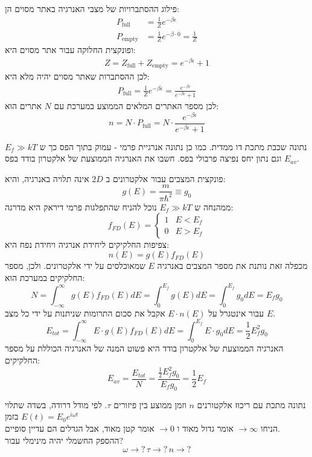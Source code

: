 \documentclass{article}
\begin{document}
\begin{Answer}
פילוג ההסתברויות של מצבי האנרגיה באתר מסוים הן:
\begin{align*}
    P_{\text{full}}&=\frac{1}{Z}e^{-\beta \epsilon}\\
    P_{\text{empty}}&=\frac{1}{Z}e^{-\beta\cdot 0}=\frac{1}{Z}
\end{align*}
ופונקצית החלוקה עבור אתר מסוים היא:
\begin{align*}
    Z=Z_{\text{full}}+Z_{\text{empty}}=e^{-\beta \epsilon}+1
\end{align*}
לכן ההסתברות שאתר מסוים יהיה מלא היא:
\begin{align*}
    P_{\text{full}}=\frac{1}{Z}e^{-\beta \epsilon}=\frac{e^{-\beta \epsilon}}{e^{-\beta \epsilon}+1}
\end{align*}
לכן מספר האתרים המלאים הממוצע במערכת עם $N$ אתרים הוא:
$$n=N\cdot P_{\text{full}}=N\cdot \frac{e^{-\beta \epsilon}}{e^{-\beta \epsilon}+1}
$$
\end{Answer}\newpage
\begin{Question}
נתונה שכבת מתכת דו ממדית. כמו כן נתונה אנרגיית פרמי - עמוק בתוך הפס כך ש $E_{f}\gg kT$ וגם נתון יחס נפיצה פרבולי בפס. חשבו את האנרגיה הממוצעת של אלקטרון בודד בפס $E_{av}$.
\end{Question}
\begin{Answer}
    פונקצית המצבים עבור אלקטרונים ב $2D$ אינה תלויה באנרגיה, והיא:
    $$g(E)=\frac{m}{\pi \hbar^{2}}\equiv g_{0}$$
    ממהנחה ש $E_{f}\gg kT$ נוכל להניח שהתפלגות פרמי דיראק היא מדרגה:
    $$f_{FD}(E)=\begin{cases}
    1 & E<E_{f}\\
    0 & E>E_{f}
    \end{cases}$$
    צפיפות החלקיקים ליחידת אנרגיה ויחידת נפח היא:
    $$n(E)=g(E)f_{FD}(E)$$ מכפלה זאת נותנת את מספר המצבים באנרגיה $E$ שמאוכלסים על ידי אלקטרונים.
    ולכן, מספר החלקיקים במערכת הוא:
    $$N=\int_{-\infty}^{\infty}g(E)f_{FD}(E)dE=\int_{0}^{E_{f}}{g(E)dE}=\int_{0}^{E_{f}}g_{0}dE=E_{f}g_{0}$$
    עבור אינטגרל על $E\cdot n(E)$ אקבל את סכום התרומות שניתנות על ידי כל מצב $E$.
    $$E_{tot}=\int_{-\infty}^{\infty}E\cdot g(E)f_{FD}(E)dE=\int_{0}^{E_{f}}{E\cdot g_{0}dE}=\frac{1}{2}E_{f}^{2}g_{0}$$
    האנרגיה הממוצעת של אלקטרון בודד היא פשוט המנה של האנרגיה הכוללת על מספר החלקיקים:
    $$E_{av}=\frac{E_{tot}}{N}=\frac{\frac{1}{2}E_{f}^{2}g_{0}}{E_{f}g_{0}}=\frac{1}{2}E_{f}$$
\end{Answer}\newpage
\begin{Question}
נתונה מתכת עם ריכוז אלקטורנים $n$ וזמן ממוצע בין פיזורים $\tau$. לפי מודל דרודה, בשדה שתלוי בזמן $E\left( t \right)=E_{0}e^{i\omega t}$\\
הניחו $\to\infty$ אומר גדול מאוד ו $\to0$ אומר קטן מאוד, אבל הגדלים הם עדיין סופיים.\\
ההספק החשמלי יהיה מינימלי עבור?
$$\omega\to?\, \tau\to?\, n\to?$$
\end{Question}
\end{document}
